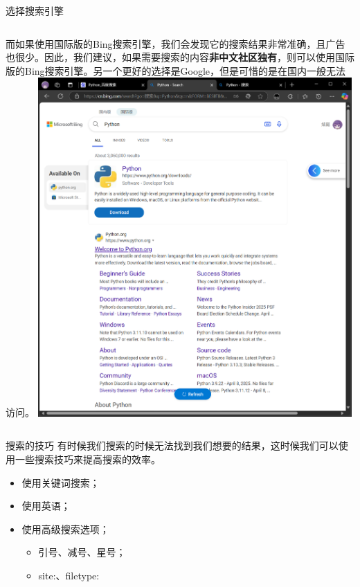 \documentclass{beamer}
\begin{document}
\begin{frame}{选择搜索引擎}
    \begin{columns}[T]
            而如果使用国际版的Bing搜索引擎，我们会发现它的搜索结果非常准确，且广告也很少。因此，我们建议，如果需要搜索的内容\textbf{非中文社区独有}，则可以使用国际版的Bing搜索引擎。另一个更好的选择是Google，但是可惜的是在国内一般无法访问。
            \includegraphics[width=0.9\textwidth]{4-3-BingI.png}
    \end{columns}
\end{frame}

\begin{frame}{搜索的技巧}
    有时候我们搜索的时候无法找到我们想要的结果，这时候我们可以使用一些搜索技巧来提高搜索的效率。

    \begin{itemize}
        \item <2->使用关键词搜索；
        \item <3->使用英语；
        \item <4->使用高级搜索选项；
        \begin{itemize}
            \item <5->引号、减号、星号；
            \item <6->site:、filetype:
        \end{itemize} 
    \end{itemize}
\end{frame}
\end{document}
